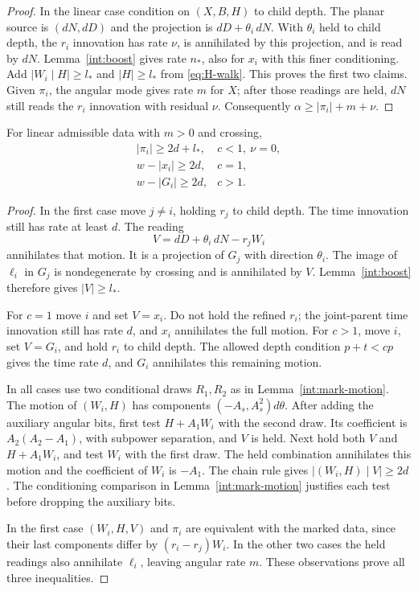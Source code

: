 \begin{proof}
In the linear case condition on $(X,B,H)$ to child
depth. The planar source is $(dN,dD)$ and the
projection is $dD+\theta_i\,dN$. With $\theta_i$
held to child depth, the $r_i$ innovation has rate
$\nu$, is annihilated by this projection, and is
read by $dN$. Lemma~\ref{int:boost} gives rate
$n_*$, also for $x_i$ with this finer conditioning.
Add $|W_i\mid H|\geq l_*$ and
$|H|\geq l_*$ from \eqref{eq:H-walk}. This proves
the first two claims. Given $\pi_i$, the angular
mode gives rate $m$ for $X$; after those readings
are held, $dN$ still reads the $r_i$ innovation
with residual $\nu$. Consequently
$\alpha\geq|\pi_i|+m+\nu$.
\end{proof}

\begin{proposition}\label{int:double}
For linear admissible data with $m>0$ and crossing,
\begin{equation}
 \begin{array}{ll}
 |\pi_i|\geq2d+l_* ,&c<1,\ \nu=0,\\
 w-|x_i|\geq2d,&c=1,\\
 w-|G_i|\geq2d,&c>1.
 \end{array}
 \tag{double}\label{eq:double}
\end{equation}
\end{proposition}

\begin{proof}
In the first case move $j\ne i$, holding $r_j$ to
child depth. The time innovation still has rate at
least $d$. The reading
\[
 V=dD+\theta_i\,dN-r_jW_i
\]
annihilates that motion. It is a projection of
$G_j$ with direction $\theta_i$. The image of
$\ell_i$ in $G_j$ is nondegenerate by crossing
and is annihilated by $V$. Lemma~\ref{int:boost}
therefore gives $|V|\geq l_*$.

For $c=1$ move $i$ and set $V=x_i$. Do not hold
the refined $r_i$; the joint-parent time innovation
still has rate $d$, and $x_i$ annihilates the full
motion. For $c>1$, move $i$, set $V=G_i$, and hold
$r_i$ to child depth. The allowed depth condition
$p+t<cp$ gives the time rate $d$, and $G_i$
annihilates this remaining motion.

In all cases use two conditional draws $R_1,R_2$
as in Lemma~\ref{int:mark-motion}. The motion of
$(W_i,H)$ has components $(-A_s,A_s^2)d\theta$.
After adding the auxiliary angular bits, first
test $H+A_1W_i$ with the second draw. Its
coefficient is $A_2(A_2-A_1)$, with subpower
separation, and $V$ is held. Next hold both $V$
and $H+A_1W_i$, and test $W_i$ with the first
draw. The held combination annihilates this
motion and the coefficient of $W_i$ is $-A_1$.
The chain rule gives
$|(W_i,H)\mid V|\geq2d$. The conditioning
comparison in Lemma~\ref{int:mark-motion}
justifies each test before dropping the
auxiliary bits.

In the first case $(W_i,H,V)$ and $\pi_i$ are
equivalent with the marked data, since their
last components differ by $(r_i-r_j)W_i$.
In the other two cases the held readings also
annihilate $\ell_i$, leaving angular rate $m$.
These observations prove all three inequalities.
\end{proof}

